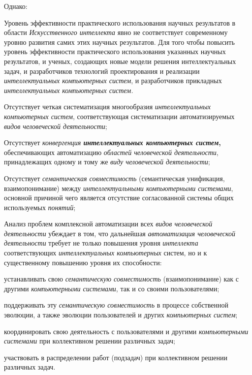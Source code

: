 Однако:

\begin{textitemize}
	\item
	Уровень эффективности практического использования научных результатов в области \textit{Искусственного интеллекта} явно не соответствует современному уровню развития самих этих научных результатов. Для того чтобы повысить уровень эффективности практического использования указанных научных результатов,   и ученых, создающих новые модели решения интеллектуальных задач, и разработчиков технологий проектирования и реализации \textit{интеллектуальных компьютерных систем}, и разработчиков прикладных \textit{интеллектуальных компьютерных систем.}
\end{textitemize}

\begin{textitemize}
	\item
	Отсутствует четкая систематизация многообразия \textit{интеллектуальных компьютерных систем}, соответствующая систематизации автоматизируемых \textit{видов человеческой деятельности};
	\item
	Отсутствует \textit{конвергенция \textbf{интеллектуальных компьютерных систем}}\textbf{,} обеспечивающих автоматизацию \textit{областей человеческой деятельности}, принадлежащих одному и тому же \textit{виду человеческой деятельности};
	\item
	Отсутствует \textit{семантическая совместимость} (семантическая унификация, взаимопонимание) между \textit{интеллектуальными компьютерными системами}, основной причиной чего является отсутствие согласованной системы общих используемых \textit{понятий};
	\item
	Анализ проблем комплексной автоматизации всех \textit{видов человеческой деятельности} убеждает в том, что дальнейшая \textit{автоматизация человеческой деятельности} требует не только повышения уровня \textit{интеллекта} соответствующих \textit{интеллектуальных компьютерных} систем, но и к существенному повышению уровня их способности:
	\begin{textitemize}
		\item
		устанавливать свою \textit{семантическую совместимость} (взаимопонимание) как с другими \textit{компьютерными системами}, так и со своими пользователями;
		\item
		поддерживать эту \textit{семантическую совместимость} в процессе собственной эволюции, а также эволюции пользователей и других \textit{компьютерных систем};
		\item
		координировать свою деятельность с пользователями и другими \textit{компьютерными системами} при коллективном решении различных задач;
		\item
		участвовать в распределении работ (подзадач) при коллективном решении различных задач.
	\end{textitemize}
\end{textitemize}


